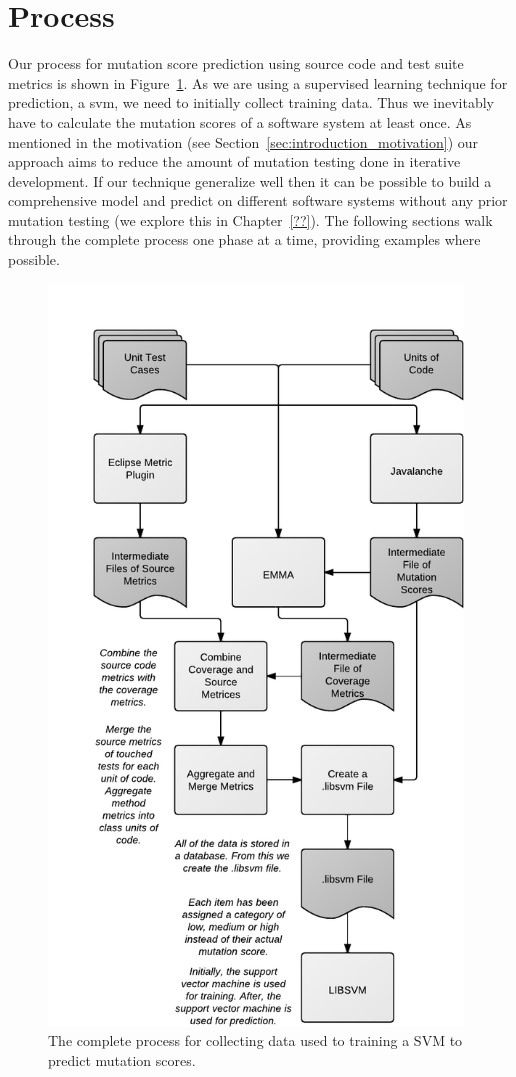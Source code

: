 \section{Process}
\label{sec:approach_process}
Our process for mutation score prediction using source code and test suite metrics is shown in Figure~\ref{fig:process}. As we are using a supervised learning technique for prediction, a \gls{svm}, we need to initially collect training data. Thus we inevitably have to calculate the mutation scores of a software system at least once. As mentioned in the motivation (see Section~\ref{sec:introduction_motivation}) our approach aims to reduce the amount of mutation testing done in iterative development. If our technique generalize well then it can be possible to build a comprehensive model and predict on different software systems without any prior mutation testing (we explore this in Chapter~\ref{??}). The following sections walk through the complete process one phase at a time, providing examples where possible.

\begin{figure}[h]
  \centering
  \includegraphics[width=11cm]{figures/process.pdf}
  \caption{The complete process for collecting data used to training a SVM to predict mutation scores.}
  \label{fig:process}
\end{figure}


